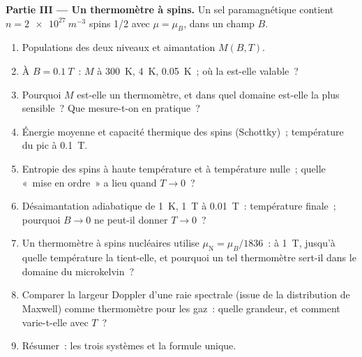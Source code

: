 \begin{problem}
\textbf{Partie III --- Un thermomètre à spins.}
Un sel paramagnétique contient $n = \qty{2e27}{m^{-3}}$ spins 1/2 avec $\mu
= \mu_B$, dans un champ $B$.
\begin{enumerate}[resume]
  \item Populations des deux niveaux et aimantation
        $M(B,T)$.
  \item À $B = \qty{0.1}{T}$~: $M$ à \qty{300}{K}, \qty{4}{K}, \qty{0.05}{K}~;
        où la  est-elle valable~?
  \item Pourquoi $M$ est-elle un thermomètre, et dans quel domaine est-elle la plus
        sensible~? Que mesure-t-on en pratique~?
  \item Énergie moyenne et capacité thermique des spins (Schottky)~;
        température du pic à \qty{0.1}{T}.
  \item Entropie des spins à haute température et à température nulle~; quelle
        «~mise en ordre~» a lieu quand $T \to 0$~?
  \item Désaimantation adiabatique de \qty{1}{K}, \qty{1}{T} à \qty{0.01}{T}~:
        température finale~; pourquoi $B \to 0$ ne peut-il donner $T \to 0$~?
  \item Un thermomètre à spins nucléaires utilise $\mu_{\text{N}} = \mu_B/1836$~: à
        \qty{1}{T}, jusqu'à quelle température la  tient-elle, et
        pourquoi un tel thermomètre sert-il dans le domaine du microkelvin~?
  \item Comparer la largeur Doppler d'une raie spectrale (issue de la
        distribution de Maxwell) comme thermomètre pour les gaz~: quelle grandeur, et
        comment varie-t-elle avec $T$~?
  \item Résumer~: les trois systèmes et la formule unique.
\end{enumerate}
\end{problem}
